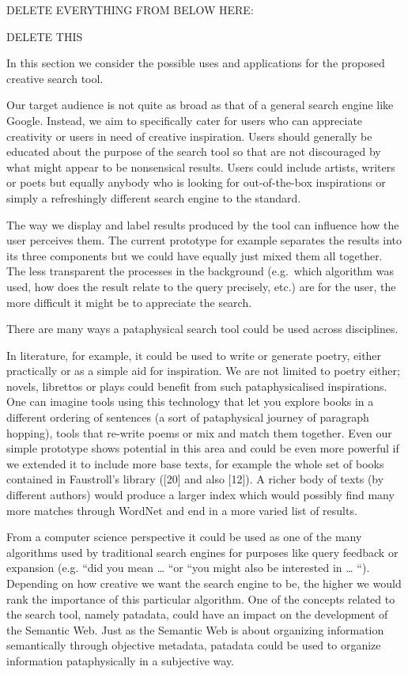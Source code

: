 DELETE EVERYTHING FROM BELOW HERE:


\begin{draft}
DELETE THIS

In this section we consider the possible uses and applications for the proposed creative search tool.

Our target audience is not quite as broad as that of a general search engine like Google. Instead, we aim to specifically cater for users who can appreciate creativity or users in need of creative inspiration. Users should generally be educated about the purpose of the search tool so that are not discouraged by what might appear to be nonsensical results. Users could include artists, writers or poets but equally anybody who is looking for out-of-the-box inspirations or simply a refreshingly different search engine to the standard.

The way we display and label results produced by the tool can influence how the user perceives them. The current prototype for example separates the results into its three components but we could have equally just mixed them all together. The less transparent the processes in the background (e.g.\ which algorithm was used, how does the result relate to the query precisely, etc.) are for the user, the more difficult it might be to appreciate the search.

There are many ways a pataphysical search tool could be used across disciplines.

In literature, for example, it could be used to write or generate poetry, either practically or as a simple aid for inspiration. We are not limited to poetry either; novels, librettos or plays could benefit from such pataphysicalised inspirations. One can imagine tools using this technology that let you explore books in a different ordering of sentences (a sort of pataphysical journey of paragraph hopping), tools that re-write poems or mix and match them together. Even our simple prototype shows potential in this area and could be even more powerful if we extended it to include more base texts, for example the whole set of books contained in Faustroll’s library ([20] and also [12]). A richer body of texts (by different authors) would produce a larger index which would possibly find many more matches through WordNet and end in a more varied list of results.

From a computer science perspective it could be used as one of the many algorithms used by traditional search engines for purposes like query feedback or expansion (e.g. “did you mean … “or “you might also be interested in … “). Depending on how creative we want the search engine to be, the higher we would rank the importance of this particular algorithm. One of the concepts related to the search tool, namely patadata, could have an impact on the development of the Semantic Web. Just as the Semantic Web is about organizing information semantically through objective metadata, patadata could be used to organize information pataphysically in a subjective way.


\end{draft}
